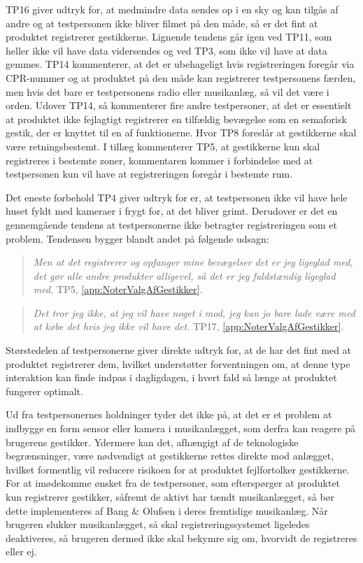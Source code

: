 TP16 giver udtryk for, at medmindre data sendes op i en sky og kan tilgås af andre og at testpersonen ikke bliver filmet på den måde, så er det fint at produktet registrerer gestikkerne. Lignende tendens går igen ved TP11, som heller ikke vil have data vidersendes og ved TP3, som ikke vil have at data gemmes. TP14 kommenterer, at det er ubehageligt hvis registreringen foregår via CPR-nummer og at produktet på den måde kan registrerer testpersonens færden, men hvis det bare er testpersonens radio eller musikanlæg, så vil det være i orden. Udover TP14, så kommenterer fire andre testpersoner, at det er essentielt at produktet ikke fejlagtigt registrerer en tilfældig bevægelse som en semaforisk gestik, der er knyttet til en af funktionerne. Hvor TP8 foreslår at gestikkerne skal være retningsbestemt. I tillæg kommenterer TP5, at gestikkerne kun skal registreres i bestemte zoner, kommentaren kommer i forbindelse med at testpersonen kun vil have at registreringen foregår i bestemte rum.  

Det eneste forbehold TP4 giver udtryk for er, at testpersonen ikke vil have hele huset fyldt med kameraer i frygt for, at det bliver grimt. Derudover er det en gennemgående tendens at testpersonerne ikke betragter registreringen som et problem. Tendensen bygger blandt andet på følgende udsagn: 
%
\begin{quotation}
\noindent
\textit{Men at det registrerer og opfanger mine bevægelser det er jeg ligeglad med, det gør alle andre produkter alligevel, så det er jeg fuldstændig ligeglad med.} TP5, \autoref{app:NoterValgAfGestikker}. 
\end{quotation}
%
%
\begin{quotation}
\noindent
\textit{Det tror jeg ikke, at jeg vil have noget i mod, jeg kan jo bare lade være med at købe det hvis jeg ikke vil have det.} TP17, \autoref{app:NoterValgAfGestikker}. 
\end{quotation}
%
Størstedelen af testpersonerne giver direkte udtryk for, at de har det fint med at produktet registrerer dem, hvilket understøtter forventningen om, at denne type interaktion kan finde indpas i dagligdagen, i hvert fald så længe at produktet fungerer optimalt.  

Ud fra testpersonernes holdninger tyder det ikke på, at det er et problem at indbygge en form sensor eller kamera i musikanlægget, som derfra kan reagere på brugerens gestikker. Ydermere kan det, afhængigt af de teknologiske begrænsninger, være nødvendigt at gestikkerne rettes direkte mod anlægget, hvilket formentlig vil reducere risikoen for at produktet fejlfortolker gestikkerne. For at imødekomme ønsket fra de testpersoner, som efterspørger at produktet kun registrerer gestikker, såfremt de aktivt har tændt musikanlægget, så bør dette implementeres af Bang $\&$ Olufsen i deres fremtidige musikanlæg. Når brugeren slukker musikanlægget, så skal registreringssystemet ligeledes deaktiveres, så brugeren dermed ikke skal bekymre sig om, hvorvidt de registreres eller ej.  

